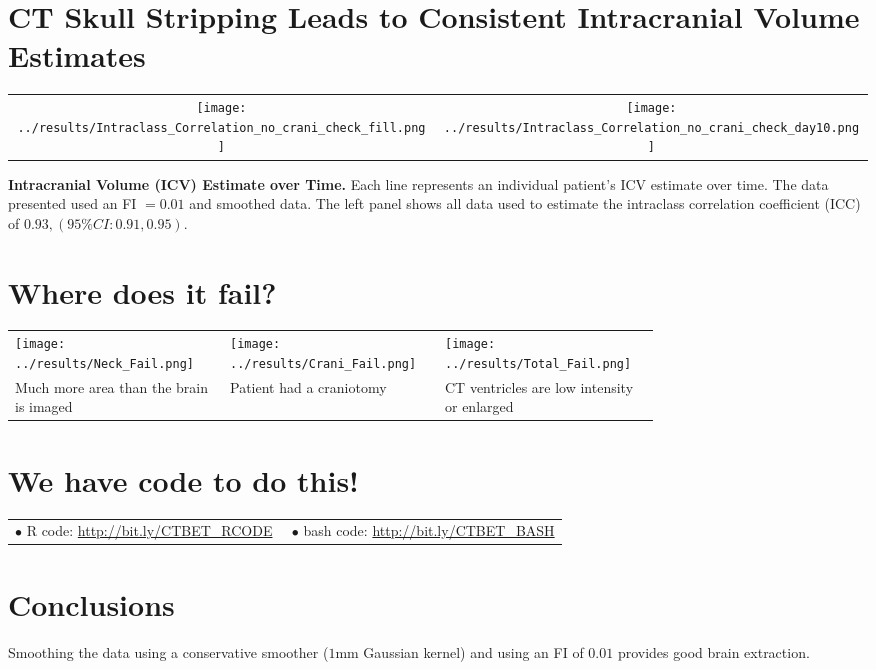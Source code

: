 \documentclass[final]{beamer}\usepackage[]{graphicx}\usepackage[]{color}
\begin{document}
\begin{frame}[fragile]
\begin{minipage}{0.39\linewidth}
\section{ CT Skull Stripping Leads to Consistent Intracranial Volume Estimates}

\begin{tabular}{cc}
	\texttt{[image: ../results/Intraclass\_Correlation\_no\_crani\_check\_fill.png]} &
	\texttt{[image: ../results/Intraclass\_Correlation\_no\_crani\_check\_day10.png]} 
\end{tabular}

{\bf Intracranial Volume (ICV) Estimate over Time.}  Each line represents an individual patient's ICV estimate over time.  The data presented used an FI $= 0.01$ and smoothed data.   The left panel shows all data used to estimate the intraclass correlation coefficient (ICC) of $0.93, (95\% CI: 0.91, 0.95)$.  

%

\section{Where does it fail?}
\begin{center}
\begin{tabular}{>{\centering}m{0.25\linewidth}>{\centering}m{0.25\linewidth}>{\centering\arraybackslash}m{0.25\linewidth}}
\texttt{[image: ../results/Neck\_Fail.png]} &
\texttt{[image: ../results/Crani\_Fail.png]} & 
\texttt{[image: ../results/Total\_Fail.png]} \\
Much more area than the brain is imaged &
Patient had a craniotomy & 
CT ventricles are low intensity or enlarged 
\end{tabular}
\end{center}

\section{We have code to do this!}

\begin{tabular}{m{0.5\linewidth} m{0.5\linewidth} }
$\bullet$ R code: \url{http://bit.ly/CTBET_RCODE} & $\bullet$ bash code: \url{http://bit.ly/CTBET_BASH}
\end{tabular}


\section{Conclusions}
\vspace*{-0.5cm}
Smoothing the data using a conservative smoother ($1$mm Gaussian kernel) and using an FI of $0.01$ provides good brain extraction.





\end{minipage}
\end{frame}
\end{document}
